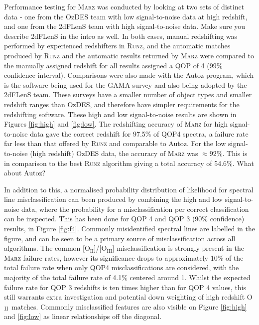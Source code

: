 \documentclass[iop]{emulateapj}
\newcommand{\tam}{\color{blue}}
\newcommand{\tamcom}{\color{red}}
\newcommand{\runz}{\textsc{Runz}}
\newcommand{\thesisname}{\textsc{Marz}}
\begin{document}
Performance testing for \thesisname{} was conducted by looking at two sets of distinct data - one from the OzDES team with low signal-to-noise data at high redshift, and one from the 2dFLenS team with high signal-to-noise data. {\tamcom Make sure you describe 2dFLenS in the intro as well.} In both cases, manual redshifting was performed by experienced redshifters in \runz{}, and the automatic matches produced by \runz{} and the automatic results returned by \thesisname{} were compared to the manually assigned redshift for all results assigned a QOP of 4 (99\% confidence interval). Comparisons were also made with the Autoz program, {\tam which is the software being used for the GAMA survey and also being adopted by the 2dFLenS team.  These surveys have a smaller number of object types  and smaller redshift ranges than OzDES, and therefore have simpler requirements for the redshifting software}. These high and low signal-to-noise results are shown in Figures \ref{fig:high} and \ref{fig:low}. The redshifting accuracy of \thesisname{} for high signal-to-noise data gave the correct redshift for 97.5\% of QOP4 spectra, a failure rate far less than that offered by \runz{} and comparable to Autoz. For the low signal-to-noise (high redshift) OzDES data, the accuracy of \thesisname{} was $\approx 92$\%. This is in comparison to the best \runz{} algorithm giving a total accuracy of 54.6\%.  {\tamcom What about Autoz?}

In addition to this, a normalised probability distribution of likelihood for spectral line misclassification can been produced by combining the high and low signal-to-noise data, where the probability for a misclassification per correct classification can be inspected. This has been done for QOP 4 and QOP 3 (90\% confidence) results, in Figure \ref{fig:f4}. Commonly misidentified {\tam spectral} lines are labelled in the figure, and can be seen to be a primary source of misclassification across all algorithms. The common [O$_{\mathrm{II}}$]/[O$_{\mathrm{III}}$] misclassification is strongly present in the \thesisname{} failure rates, however its significance drops to approximately 10\% of the total failure rate when only QOP4 misclassifications are considered, with the majority of the total failure rate of 4.1\% centered around 1. Whilst the expected failure rate for QOP 3 redshifts is ten times higher than for QOP 4 values, this still warrants extra investigation and potential down weighting of high redshift O$_{\rm{II}}$ matches. Commonly misclassified features are also visible on Figure \ref{fig:high} and \ref{fig:low} as linear relationships off the diagonal.
\end{document}
